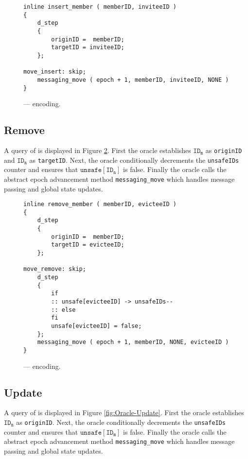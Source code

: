 \begin{figure}[h!]
  \centering
  \caption{\label{fig:Oracle-Insert}\CGKAmod{}{}{} ---  encoding.}
\begin{verbatim}
inline insert_member ( memberID, inviteeID )
{
    d_step
    {
        originID =  memberID;
        targetID = inviteeID;
    };

move_insert: skip;
    messaging_move ( epoch + 1, memberID, inviteeID, NONE )
}
\end{verbatim}
\end{figure}


\hypertarget{remove}{%
\subsection{Remove}\label{remove}}

A query of  is displayed in Figure \ref{fig:Oracle-Remove}.
First the oracle establishes \(\mathtt{ID_m}\) as \texttt{originID} and \(\mathtt{ID_n}\) as \texttt{targetID}.
Next, the oracle conditionally decrements the \texttt{unsafeIDs} counter and ensures that \(\mathtt{unsafe[ID_n]}\) is false.
Finally the oracle calls the abstract epoch advancement method \texttt{messaging\_move} which handles message passing and global state updates.

\begin{figure}[h!]
  \centering
  \caption{\label{fig:Oracle-Remove}\CGKAmod{}{}{} ---  encoding.}
\begin{verbatim}
inline remove_member ( memberID, evicteeID )
{
    d_step
    {
        originID =  memberID;
        targetID = evicteeID;
    };

move_remove: skip;
    d_step
    {
        if
        :: unsafe[evicteeID] -> unsafeIDs--
        :: else
        fi
        unsafe[evicteeID] = false;
    };
    messaging_move ( epoch + 1, memberID, NONE, evicteeID )
}
\end{verbatim}
\end{figure}


\hypertarget{sec:update}{%
\subsection{Update}\label{sec:update}}

A query of  is displayed in Figure \ref{fig:Oracle-Update}.
First the oracle establishes \(\mathtt{ID_n}\) as \texttt{originID}.
Next, the oracle conditionally decrements the \texttt{unsafeIDs} counter and ensures that \(\mathtt{unsafe[ID_m]}\) is false.
Finally the oracle calls the abstract epoch advancement method \texttt{messaging\_move} which handles message passing and global state updates.

